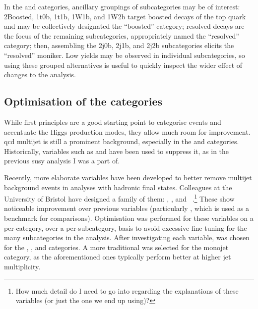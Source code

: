 In the \ttH and \VH categories, ancillary groupings of subcategories may be of interest: 2Boosted, 1t0b, 1t1b, 1W1b, and 1W2b target boosted decays of the top quark and may be collectively designated the ``\ttH boosted'' category; resolved decays are the focus of the remaining subcategories, appropriately named the ``\ttH resolved'' category; then, assembling the 2j0b, 2j1b, and 2j2b \VH subcategories elicits the ``\VH resolved'' moniker. Low yields may be observed in individual subcategories, so using these grouped alternatives is useful to quickly inspect the wider effect of changes to the analysis.




\subsection{Optimisation of the categories}
\label{subsec:htoinv_cat_optimisation}


While first principles are a good starting point to categorise events and accentuate the Higgs production modes, they allow much room for improvement. \acrshort{qcd} multijet is still a prominent background, especially in the \ttH and \ggH categories. Historically, variables such as \biasedDPhi and \alphat have been used to suppress it, as in the previous \acrlong{susy} analysis I was a part of.

Recently, more elaborate variables have been developed to better remove multijet background events in analyses with hadronic final states. Colleagues at the University of Bristol have designed a family of them: \minChi, \omegaHat, and \omegaTilde~\cite{Sakuma:2018xrq}.\footnote{How much detail do I need to go into regarding the explanations of these variables (or just the one we end up using)?} These show noticeable improvement over previous variables (particularly \biasedDPhi, which is used as a benchmark for comparisons). Optimisation was performed for these variables on a per-category, over a per-subcategory, basis to avoid excessive fine tuning for the many subcategories in the analysis. After investigating each variable, \omegaTilde was chosen for the \ttH, \VH, and \ggH categories. A more traditional \mindphiJetMet was selected for the monojet category, as the aforementioned ones typically perform better at higher \gls{jet} multiplicity.

